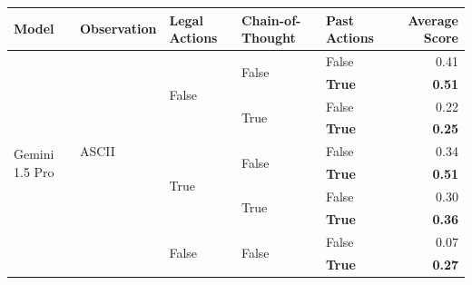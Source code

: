 \begin{tabular}{@{}lllllr@{}}
    \toprule
    \textbf{Model}                          & \textbf{Observation}              & \textbf{Legal Actions}    & \textbf{Chain-of-Thought} & \textbf{Past Actions} & \textbf{Average Score} \\
    \midrule
    \multirow[c]{28}{*}{Gemini 1.5 Pro}     & \multirow[c]{9}{*}{ASCII}         & \multirow[c]{4}{*}{False} & \multirow[c]{2}{*}{False} & False                 & 0.41 \\
                                            &                                   &                           &                           & \textbf{True}         & \textbf{0.51} \\
    \cmidrule{4-6}                  
                                            &                                   &                           & \multirow[c]{2}{*}{True}  & False                 & 0.22 \\
                                            &                                   &                           &                           & \textbf{True}         & \textbf{0.25} \\
    \cmidrule{3-6}                  
                                            &                                   & \multirow[c]{4}{*}{True}  & \multirow[c]{2}{*}{False} & False                 & 0.34 \\
                                            &                                   &                           &                           & \textbf{True}         & \textbf{0.51} \\
    \cmidrule{4-6}                  
                                            &                                   &                           & \multirow[c]{2}{*}{True}  & False                 & 0.30 \\
                                            &                                   &                           &                           & \textbf{True}         & \textbf{0.36} \\
    \cmidrule{2-6}                  
                                            & \multirow[c]{9}{*}{Coordinates}   & \multirow[c]{4}{*}{False} & \multirow[c]{2}{*}{False} & False                 & 0.07 \\
                                            &                                   &                           &                           & \textbf{True}         & \textbf{0.27} \\

\end{tabular}
